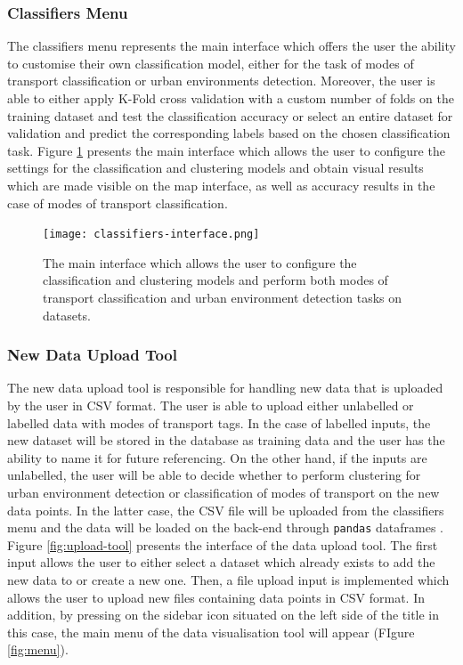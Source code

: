 \documentclass[bsc,frontabs,twoside,singlespacing, parskip,deptreport]{infthesis}     %
\begin{document}
\subsubsection*{Classifiers Menu}

The classifiers menu represents the main interface which offers the user the ability to customise their own classification model, either for the task of modes of transport classification or urban environments detection. Moreover, the user is able to either apply K-Fold cross validation with a custom number of folds on the training dataset and test the classification accuracy or select an entire dataset for validation and predict the corresponding labels based on the chosen classification task. Figure \ref{fig:classifiers-interface} presents the main interface which allows the user to configure the settings for the classification and clustering models and obtain visual results which are made visible on the map interface, as well as accuracy results in the case of modes of transport classification.

\begin{figure}[h!]
  \texttt{[image: classifiers-interface.png]}
  \caption{The main interface which allows the user to configure the classification and clustering models and perform both modes of transport classification and urban environment detection tasks on datasets.}
  \label{fig:classifiers-interface}
\end{figure}

\subsubsection*{New Data Upload Tool}

The new data upload tool is responsible for handling new data that is uploaded by the user in CSV format. The user is able to upload either unlabelled or labelled data with modes of transport tags. In the case of labelled inputs, the new dataset will be stored in the database as training data and the user has the ability to name it for future referencing. On the other hand, if the inputs are unlabelled, the user will be able to decide whether to perform clustering for urban environment detection or classification of modes of transport on the new data points. In the latter case, the CSV file will be uploaded from the classifiers menu and the data will be loaded on the back-end through \texttt{pandas} dataframes \cite{pandas}. Figure \ref{fig:upload-tool} presents the interface of the data upload tool. The first input allows the user to either select a dataset which already exists to add the new data to or create a new one. Then, a file upload input is implemented which allows the user to upload new files containing data points in CSV format. In addition, by pressing on the sidebar icon situated on the left side of the title in this case, the main menu of the data visualisation tool will appear (FIgure \ref{fig:menu}).
\end{document}
